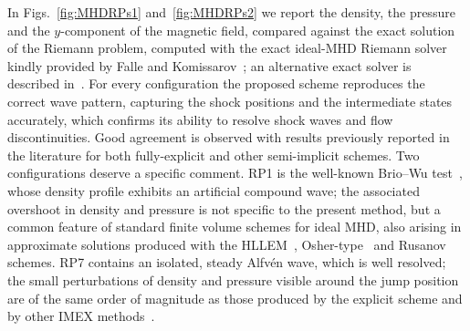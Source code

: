 \documentclass[a4paper,fleqn]{cas-sc}
\theoremstyle{definition}
\theoremstyle{remark}
\begin{document}
In Figs.~\ref{fig:MHDRPs1} and~\ref{fig:MHDRPs2} we report the density, the 
pressure and the $y$-component of the magnetic field, compared against the exact 
solution of the Riemann problem, computed with the exact ideal-MHD Riemann solver 
kindly provided by Falle and Komissarov~\cite{exact1,exact2}; an alternative 
exact solver is described in~\cite{exact3}. For every configuration the 
proposed scheme reproduces the correct wave pattern, capturing the shock positions 
and the intermediate states accurately, which confirms its ability to resolve 
shock waves and flow discontinuities. Good agreement is observed with results 
previously reported in the literature for both fully-explicit and other 
semi-implicit schemes. Two 
configurations deserve a specific comment. RP1 is the well-known Brio--Wu 
test~\cite{BrioWu1988}, whose density profile exhibits an artificial compound wave; 
the associated overshoot in density and pressure is not specific to the present 
method, but a common feature of standard finite volume schemes for ideal MHD, 
also arising in approximate solutions produced with the 
HLLEM~\cite{DumbserHLLEM}, Osher-type~\cite{DumbserToro} and Rusanov schemes. 
RP7 contains an isolated, steady Alfvén wave, which is well resolved; the small 
perturbations of density and pressure visible around the jump position are of 
the same order of magnitude as those produced by the explicit scheme and by 
other IMEX methods~\cite{BoscheriThomann2024}.
\end{document}
